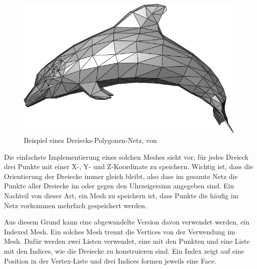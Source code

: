 \begin{figure}[h]
	\centering
	\includegraphics[width=0.7\linewidth]{Images/Dolphin_triangle_mesh}
	\caption[Beispiel eines Polygonen-Netzes]{Beispiel eines Dreiecks-Polygonen-Netz, von \cite{WikipediaDolphin1}}
	\label{fig:dolphintrianglemesh}
\end{figure}


Die einfachste Implementierung eines solchen Meshes sieht vor, f\"ur jedes Dreieck drei Punkte mit einer X-, Y- und Z-Koordinate zu speichern. Wichtig ist, dass die Orientierung der Dreiecke immer gleich bleibt, also dass im gesamte Netz die Punkte aller Dreiecke im oder gegen den Uhrzeigersinn angegeben sind. Ein Nachteil von dieser Art, ein Mesh zu speichern ist, dass Punkte die h\"aufig im Netz vorkommen mehrfach gespeichert werden. 

Aus diesem Grund kann eine abgewandelte Version davon verwendet werden, ein Indexed Mesh. Ein solches Mesh trennt die Vertices von der Verwendung im Mesh. Daf\"ur werden zwei Listen verwendet, eine mit den Punkten und eine Liste mit den Indices, wie die Dreiecke zu konstruieren sind. Ein Index zeigt auf eine Position in der Vertex-Liste und drei Indices formen jeweils eine Face.

